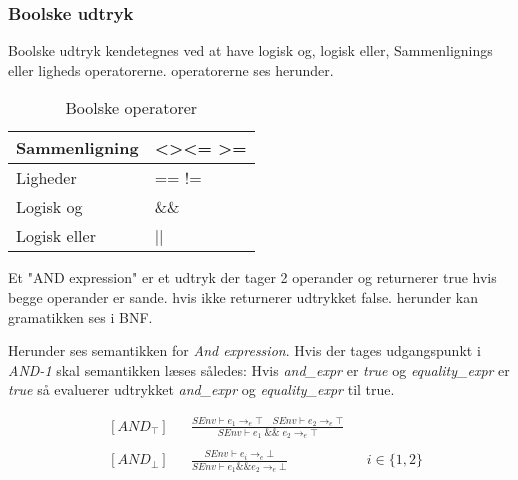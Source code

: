 \subsubsection{Boolske udtryk}
Boolske udtryk kendetegnes ved at have logisk og, logisk eller, Sammenlignings eller ligheds operatorerne. operatorerne ses herunder.

\begin{table}[H]
    \centering
    \begin{tabular}{|l|l|}
        \hline
        \centering

        Sammenligning      & \textless \quad \textgreater \quad \textless= \quad\textgreater= \\ \hline
        Ligheder           & == \quad !=                                                      \\ \hline
        Logisk og          & \&\&                                                              \\ \hline
        Logisk eller       & ||                                                               \\ \hline


    \end{tabular}
    \caption{Boolske operatorer}
    \label{tab:operatorerboolsk}
\end{table}

\noindent Et "AND expression" er et udtryk der tager 2 operander og returnerer true hvis begge operander er sande. hvis ikke returnerer udtrykket false.
herunder kan gramatikken ses i BNF.


\noindent Herunder ses semantikken for \textit{And expression}. Hvis der tages udgangspunkt i \textit{AND-1} skal semantikken læses således: Hvis \textit{and\_expr} er \textit{true} og \textit{equality\_expr} er \textit{true} så evaluerer udtrykket \textit{and\_expr} og \textit{equality\_expr} til true.


\begin{align*}
&[AND_\top] & &\frac{SEnv \vdash e_1 \rightarrow_e \top \quad SEnv \vdash e_2 \rightarrow_e \top}{SEnv \vdash e_1\; \&\&\; e_2 \rightarrow_e \top}\\\\
&[AND_\bot] & &\frac{SEnv \vdash e_i \rightarrow_e \bot}{SEnv \vdash e_1 \&\& e_2 \rightarrow_e \bot} & &i \in \{1, 2\}\\\\
\end{align*}        

